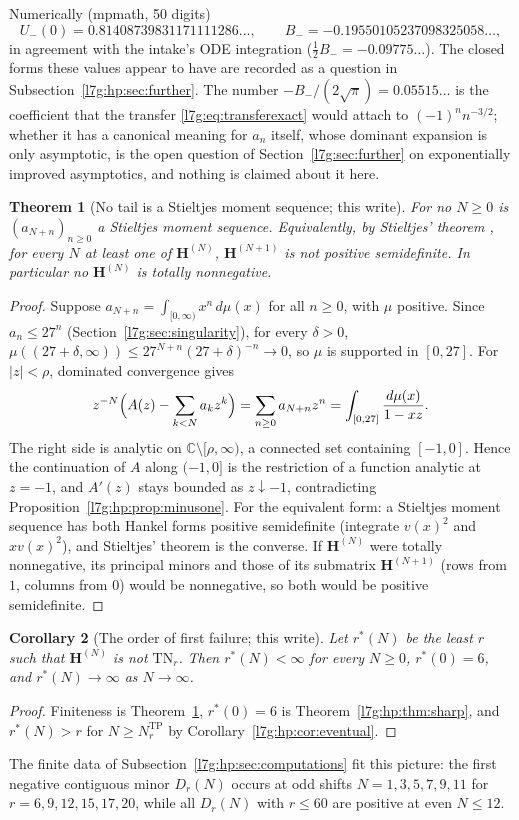 \documentclass[11pt,letterpaper]{article}
\newtheorem{theorem}{Theorem}[section]
\newtheorem{corollary}[theorem]{Corollary}
\theoremstyle{remark}\newtheorem{remark}[theorem]{Remark}
\newcommand{\TP}{\mathrm{TP}}\newcommand{\TN}{\mathrm{TN}}
\newcounter{l7gtrsavedeq}
\begin{document}
Numerically (mpmath, 50 digits)
\[
 U_-(0)=0.81408739831171111286\ldots,\qquad
 B_-=-0.19550105237098325058\ldots,
\]
in agreement with the intake's ODE integration ($\frac12B_-=-0.09775\ldots$).
The closed forms these values appear to have are recorded as a question in
Subsection~\ref{l7g:hp:sec:further}. The number
$-B_-/(2\sqrt\pi)=0.05515\ldots$ is the coefficient that the transfer
\eqref{l7g:eq:transferexact} would attach to $(-1)^nn^{-3/2}$; whether it
has a canonical meaning for $a_n$ itself, whose dominant expansion is only
asymptotic, is the open question of Section~\ref{l7g:sec:further} on
exponentially improved asymptotics, and nothing is claimed about it here.

\begin{theorem}[No tail is a Stieltjes moment sequence; this write]\label{l7g:hp:thm:nostieltjes}
For no $N\ge0$ is $(a_{N+n})_{n\ge0}$ a Stieltjes moment sequence.
Equivalently, by Stieltjes' theorem \cite[Chapter~3]{l7g:hp:schmudgen}, for
every $N$ at least one of $\mathbf H^{(N)}$, $\mathbf H^{(N+1)}$ is not
positive semidefinite. In particular no $\mathbf H^{(N)}$ is totally
nonnegative.
\end{theorem}
\begin{proof}
Suppose $a_{N+n}=\int_{[0,\infty)}x^n\,d\mu(x)$ for all $n\ge0$, with $\mu$
positive. Since $a_n\le27^n$ (Section~\ref{l7g:sec:singularity}), for every
$\delta>0$,
$\mu((27+\delta,\infty))\le27^{N+n}(27+\delta)^{-n}\to0$, so $\mu$ is
supported in $[0,27]$. For $|z|<\rho$, dominated convergence gives
\[
 z^{-N}\Bigl(A(z)-\sum_{k<N}a_kz^k\Bigr)=\sum_{n\ge0}a_{N+n}z^n
 =\int_{[0,27]}\frac{d\mu(x)}{1-xz}.
\]
The right side is analytic on $\mathbb C\setminus[\rho,\infty)$, a
connected set containing $[-1,0]$. Hence the continuation of $A$ along
$(-1,0]$ is the restriction of a function analytic at $z=-1$, and $A'(z)$
stays bounded as $z\downarrow-1$, contradicting
Proposition~\ref{l7g:hp:prop:minusone}. For the equivalent form: a
Stieltjes moment sequence has both Hankel forms positive semidefinite
(integrate $v(x)^2$ and $xv(x)^2$), and Stieltjes' theorem is the converse.
If $\mathbf H^{(N)}$ were totally nonnegative, its principal minors and
those of its submatrix $\mathbf H^{(N+1)}$ (rows from $1$, columns from
$0$) would be nonnegative, so both would be positive semidefinite.
\end{proof}

\begin{corollary}[The order of first failure; this write]\label{l7g:hp:cor:rstar}
Let $r^*(N)$ be the least $r$ such that $\mathbf H^{(N)}$ is not $\TN_r$.
Then $r^*(N)<\infty$ for every $N\ge0$, $r^*(0)=6$, and $r^*(N)\to\infty$ as
$N\to\infty$.
\end{corollary}
\begin{proof}
Finiteness is Theorem~\ref{l7g:hp:thm:nostieltjes}, $r^*(0)=6$ is
Theorem~\ref{l7g:hp:thm:sharp}, and $r^*(N)>r$ for $N\ge N^{\TP}_r$ by
Corollary~\ref{l7g:hp:cor:eventual}.
\end{proof}
The finite data of Subsection~\ref{l7g:hp:sec:computations} fit this
picture: the first negative contiguous minor $D_r(N)$ occurs at odd shifts
$N=1,3,5,7,9,11$ for $r=6,9,12,15,17,20$, while all $D_r(N)$ with $r\le60$
are positive at even $N\le12$.
\end{document}
